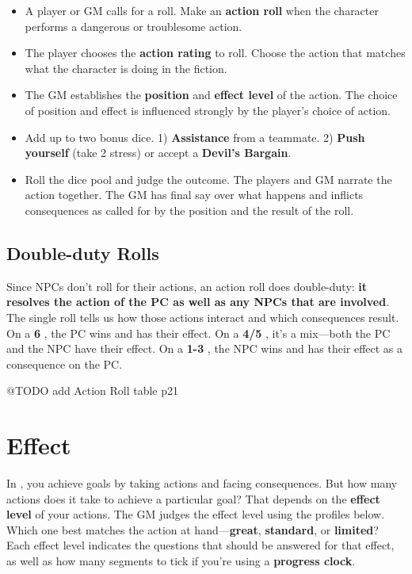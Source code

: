\documentclass[11pt,fleqn,a5paper]{book}
\newcommand{\gameterm}[1]{\textbf{#1}}
\begin{document}
\begin{itemize}
	\item A player or GM calls for a roll. Make an \textbf{action roll} when the character performs a dangerous or troublesome action.
	\item The player chooses the \textbf{action rating} to roll. Choose the action that matches what the character is doing in the fiction.
	\item The GM establishes the \textbf{position} and \textbf{effect level} of the action. The choice of position and effect is influenced strongly by the player’s choice of action.
	\item Add up to two bonus dice. 1) \textbf{Assistance} from a teammate. 2) \textbf{Push yourself} (take 2 stress) or accept a \textbf{Devil’s Bargain}.
	\item Roll the dice pool and judge the outcome. The players and GM narrate the action together. The GM has final say over what happens and inflicts consequences as called for by the position and the result of the roll.
\end{itemize}

\section{Double-duty Rolls}

Since NPCs don’t roll for their actions, an action roll does double-duty: \textbf{it resolves the action of the PC as well as any NPCs that are involved}. The single roll tells us how those actions interact and which consequences result. On a \gameterm{6} , the PC wins and has their effect. On a \gameterm{4/5} , it’s a mix---both the PC and the NPC have their effect. On a \gameterm{1-3} , the NPC wins and has their effect as a consequence on the PC.

@TODO add Action Roll table p21

\chapter{Effect}

In \thetitle{}, you achieve goals by taking actions and facing consequences. But how many actions does it take to achieve a particular goal? That depends on the \textbf{effect level} of your actions. The GM judges the effect level using the profiles below. Which one best matches the action at hand---\textbf{great}, \textbf{standard}, or \textbf{limited}? Each effect level indicates the questions that should be answered for that effect, as well as how many segments to tick if you’re using a \textbf{progress clock}.
\end{document}
